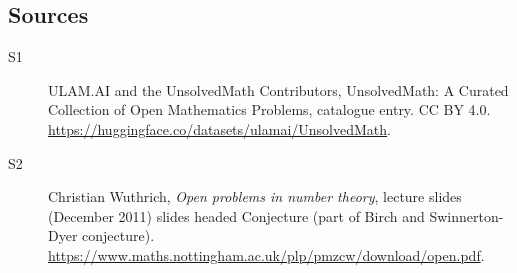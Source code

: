 \documentclass[11pt]{article}
\begin{document}
\subsection{Sources}
\begin{description}
\item[\hypertarget{source:statement:1}{S1}] ULAM.AI and the UnsolvedMath Contributors, UnsolvedMath: A Curated Collection of Open Mathematics Problems, catalogue entry. CC BY 4.0. \url{https://huggingface.co/datasets/ulamai/UnsolvedMath}.
\item[\hypertarget{source:statement:2}{S2}] Christian Wuthrich, \emph{Open problems in number theory}, lecture slides (December 2011) slides headed Conjecture (part of Birch and Swinnerton-Dyer conjecture). \url{https://www.maths.nottingham.ac.uk/plp/pmzcw/download/open.pdf}.
\end{description}
\label{end:statement}
\end{document}
